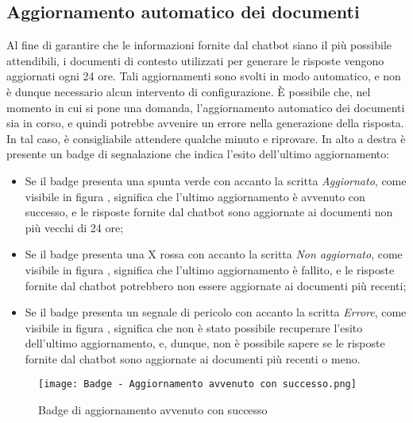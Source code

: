 \subsection{Aggiornamento automatico dei documenti}
\label{subsec:aggiornamento_automatico_documenti}
Al fine di garantire che le informazioni fornite dal chatbot siano il più possibile attendibili, i documenti di contesto utilizzati per generare le risposte vengono aggiornati ogni 24 ore.
Tali aggiornamenti sono svolti in modo automatico, e non è dunque necessario alcun intervento di configurazione.
È possibile che, nel momento in cui si pone una domanda, l'aggiornamento automatico dei documenti sia in corso, e quindi potrebbe avvenire un errore nella generazione della risposta. In tal caso, è consigliabile attendere qualche minuto e riprovare.
In alto a destra è presente un badge di segnalazione che indica l'esito dell'ultimo aggiornamento:
\begin{itemize}
    \item Se il badge presenta una spunta verde con accanto la scritta \emph{Aggiornato}, come visibile in figura , significa che l'ultimo aggiornamento è avvenuto con successo, e le risposte fornite
    dal chatbot sono aggiornate ai documenti non più vecchi di 24 ore;
    \item Se il badge presenta una X rossa con accanto la scritta \emph{Non aggiornato}, come visibile in figura , significa che l'ultimo aggiornamento è fallito, e le risposte fornite dal chatbot potrebbero
    non essere aggiornate ai documenti più recenti;
    \item Se il badge presenta un segnale di pericolo con accanto la scritta \emph{Errore}, come visibile in figura , significa che non è stato possibile recuperare l'esito dell'ultimo aggiornamento, e, dunque, non è possibile sapere se le risposte fornite dal chatbot sono aggiornate ai documenti più recenti o meno.
\end{itemize}

\begin{figure}[h]
    \centering
        \texttt{[image: Badge - Aggiornamento avvenuto con successo.png]}
        \caption{Badge di aggiornamento avvenuto con successo}
        \label{fig:Aggiornamento avvenuto con successo}        
\end{figure}

\newpage

